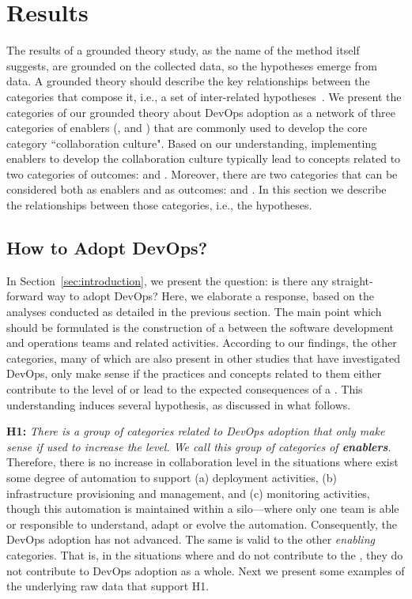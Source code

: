\section{Results} \label{sec:results}

The results of a grounded theory study, as the name of the method itself
suggests, are grounded on the collected data, so the hypotheses emerge from
data. A grounded theory should describe the key relationships between the
categories that compose it, i.e., a set of inter-related hypotheses~\cite{hoda2017becoming}.
We present the categories of our grounded theory
about DevOps adoption as a network of three categories of enablers (,
 and ) that are commonly used to develop the core category
``collaboration culture". Based on our understanding, implementing enablers to develop the collaboration
culture typically lead to concepts related to two categories of outcomes:
 and . Moreover, there are two categories that can be considered
both as enablers and as outcomes:  and .
In this section we describe the relationships between those categories, i.e.,
the hypotheses.

\subsection{How to Adopt DevOps?}

In Section~\ref{sec:introduction}, we present the question: is there any
straight-forward way to adopt DevOps? Here, we elaborate a response,
based on the analyses conducted as detailed in the previous section. The main
point which should be formulated is the construction of a  between the software development and operations teams and
related activities. According to our findings, the other categories,
many of which are also present in other studies that have investigated DevOps,
only make sense if the practices and
concepts related to them either contribute to the level of  or lead to the expected consequences of a . This understanding induces several hypothesis, as discussed in
what follows.

\textbf{H1:} \textit{There is a group of categories related to DevOps adoption
that only make sense if used to increase the  level. We
call this group of categories of \textbf{enablers}}. Therefore, there is no increase in collaboration
level in the situations
where exist some degree of
automation to support (a) deployment activities, (b) infrastructure provisioning and management,
and (c) monitoring activities, though this automation is maintained within a silo---where
only one team is able or responsible to understand, adapt or
evolve the automation. Consequently, the DevOps adoption has not advanced. The same is valid to the
other \emph{enabling} categories. That is, in the situations where
 and  do not contribute to
the , they do not contribute to DevOps adoption as a whole. Next
we present some examples of the underlying raw data that support H1.

